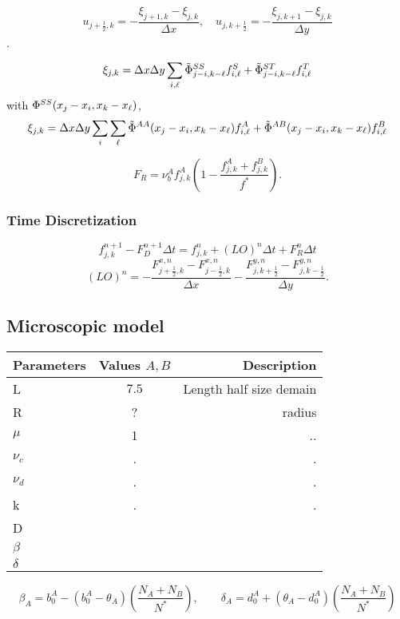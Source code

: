 $$u_{j+\frac{1}{2},k}=-\frac{\xi_{j+1,k}-\xi_{j,k}}{\Delta x}, \quad u_{j,k+\frac{1}{2}}=-\frac{\xi_{j,k+1}-\xi_{j,k}}{\Delta y}$$.

$$ \xi_{j,k}=\Delta x \Delta y \sum_{i,{\ell}} \tilde{\Phi}^{SS}_{j-i,k-{\ell}} f^{S}_{i,{\ell}}+
\tilde{\Phi}^{ST}_{j-i,k-{\ell}} f^{T}_{i,{\ell}} $$
with ${\Phi}^{SS}(x_j-x_i,x_k-x_{{\ell}})$,
$$ \xi_{j,k}=\Delta x \Delta y \sum_{i} \sum_{{\ell}} \tilde{\Phi}^{AA}(x_{j}-x_{i},x_{k}-x_{{\ell}}) f^{A}_{i,{\ell}}+
\tilde{\Phi}^{AB}(x_{j}-x_{i},x_{k}-x_{{\ell}}) f^{B}_{i,{\ell}} $$

$$ F_R=\nu_b^{A}f^{A}_{j,k}\left(1-\frac{f^{A}_{j,k}+f^{B}_{j,k}}{f^{*}}\right). $$


\subsubsection{Time Discretization}
\begin{equation}
	f_{j,k}^{n+1}-F_{D}^{n+1} \Delta t= f_{j,k}^{n}+(LO)^{n} \Delta t + F_{R}^{n} \Delta t
\end{equation}
 $$(LO)^{n}=-\frac{F^{x,n}_{j+\frac{1}{2},k}-F^{x,n}_{j-\frac{1}{2},k}}{\Delta x}-\frac{F^{y,n}_{j,k+\frac{1}{2}}-F^{y,n}_{j,k-\frac{1}{2}}}{\Delta y}.	$$
\subsection{Microscopic model}



	\begin{center}
	\begin{tabular}{ l | c | r }
		\hline
		Parameters & Values $A, B$ & Description \\ \hline
		L & $7.5$ & Length half size demain  \\ 
		R & ? &  radius \\
	
		$\mu$ & 1  & ..\\
		$\nu_c$  & .&  . \\
		$\nu_d$  & .&  . \\
		k & . & .\\
		D & & \\
		$\beta$ & & \\
		$\delta$ & & \\

		\hline
	\end{tabular}
\end{center}	

\begin{equation}
\beta_{A}=b_{0}^{A}-(b_{0}^{A}-\theta_{A})\left(\frac{N_A+N_B}{N^{*}}\right), \quad\quad \delta_{A}=d_{0}^{A}+(\theta_{A}-d_{0}^{A})\left(\frac{N_A+N_B}{N^{*}}\right)
\end{equation}


